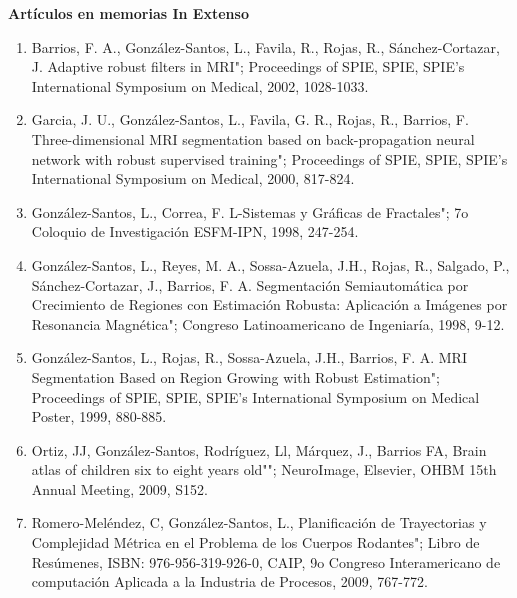 \textbf{Artículos en memorias In Extenso}

\hfill

\begin{enumerate}

\item Barrios, F. A., González-Santos, L., Favila, R., Rojas, R., Sánchez-Cortazar, J. Adaptive robust filters in MRI"; Proceedings of SPIE, SPIE, 
SPIE's International Symposium on Medical, 2002, 1028-1033.

\item Garcia, J. U., González-Santos, L., Favila, G. R., Rojas, R., Barrios, F. Three-dimensional MRI segmentation based on back-propagation neural 
network with robust supervised training"; Proceedings 
of SPIE, SPIE, SPIE's International Symposium on Medical, 2000, 817-824.

\item González-Santos, L., Correa, F. L-Sistemas y Gráficas de Fractales"; 7o Coloquio de Investigación ESFM-IPN, 1998, 247-254.

\item González-Santos, L., Reyes, M. A., Sossa-Azuela, J.H., Rojas, R., Salgado, P., Sánchez-Cortazar, J., Barrios, F. A. Segmentación Semiautomática 
por Crecimiento de Regiones con Estimación Robusta: Aplicación a Imágenes por Resonancia 
Magnética"; Congreso Latinoamericano de Ingeniaría, 1998, 9-12.

\item González-Santos, L., Rojas, R., Sossa-Azuela, J.H., Barrios, F. A. MRI Segmentation Based on Region Growing with Robust Estimation"; 
Proceedings of SPIE, SPIE, SPIE's International Symposium 
on Medical Poster, 1999, 880-885.

\item Ortiz, JJ, González-Santos, Rodríguez, Ll, Márquez, J., Barrios FA, Brain atlas of children six to eight years old""; NeuroImage, Elsevier, 
OHBM 15th Annual Meeting, 2009, S152.

\item Romero-Meléndez, C, González-Santos, L., Planificación de Trayectorias y Complejidad Métrica en el Problema de los Cuerpos Rodantes"; Libro de 
Resúmenes, ISBN: 
976-956-319-926-0, CAIP, 9o Congreso Interamericano de computación Aplicada a la Industria de Procesos, 2009, 767-772.

\end{enumerate}


